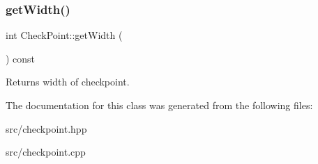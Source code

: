 \subsubsection{\texorpdfstring{get\+Width()}{getWidth()}}
{\footnotesize\ttfamily int Check\+Point\+::get\+Width (\begin{DoxyParamCaption}{ }\end{DoxyParamCaption}) const\hspace{0.3cm}{\ttfamily [inline]}}

Returns width of checkpoint. 

The documentation for this class was generated from the following files\+:\begin{DoxyCompactItemize}
\item 
src/checkpoint.\+hpp\item 
src/checkpoint.\+cpp\end{DoxyCompactItemize}
